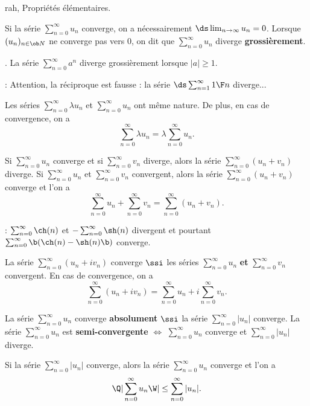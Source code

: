 \Subsection rah, Propriétés élémentaires.


Si la série $\sum_{n=0}^\infty u_n$ converge, on a nécessairement $\ds\lim_{n\to\infty}u_n=0$. \medskip\noindent
Lorsque $(u_n)_{n\in\ob N}$ ne converge pas vers $0$, 
on dit que $\sum_{n=0}^\infty u_n$ diverge {\bf grossièrement}. 

\Exemple. La série $\sum_{n=0}^\infty a^n$ diverge grossièrement lorsque $|a|\ge1$. 
\bigskip

\Remarque : Attention, la réciproque est fausse : la série $\ds\sum_{n=1}^\infty{1\F n}$ diverge... 
\bigskip



Les séries $\sum_{n=0}^\infty \lambda u_n$ et $\sum_{n=0}^\infty u_n$ ont même nature. 
De plus, en cas de convergence, on a 
\Equation [\bf Multiplication]
$$
\sum_{n=0}^\infty\lambda u_n=\lambda\sum_{n=0}^\infty u_n. 
$$

Si $\sum_{n=0}^\infty u_n$ converge et si $\sum_{n=0}^\infty v_n$ diverge, 
alors la série $\sum_{n=0}^\infty(u_n+v_n)$ diverge. \medskip\noindent 
Si $\sum_{n=0}^\infty u_n$ et $\sum_{n=0}^\infty v_n$ convergent, 
alors la série $\sum_{n=0}^\infty(u_n+v_n)$ converge et l'on a 
\Equation[\bf Addition]
$$
\sum_{n=0}^\infty u_n+\sum_{n=0}^\infty v_n=\sum_{n=0}^\infty(u_n+v_n).
$$ 

\Remarque : $\sum_{n=0}^\infty\ch(n)$ et $-\sum_{n=0}^\infty\sh(n)$ divergent et pourtant $\sum_{n=0}^\infty\b(\ch (n)-\sh(n)\b)$ converge. 
\bigskip

La série $\sum_{n=0}^\infty(u_n+iv_n)$ converge $\ssi$ les séries 
$\sum_{n=0}^\infty u_n$ {\bf et} $\sum_{n=0}^\infty v_n$ convergent. 
En cas de convergence, on a 
\Equation [\bf Composantes]
$$
\sum_{n=0}^\infty(u_n+i v_n)=\sum_{n=0}^\infty u_n+i\sum_{n=0}^\infty v_n. 
$$

La série $\sum_{n=0}^\infty u_n$ converge {\bf absolument} $\ssi$ 
la série $\sum_{n=0}^\infty|u_n|$ converge. \medskip\noindent
La série $\sum_{n=0}^\infty u_n$ est {\bf semi-convergente} $\Longleftrightarrow$ 
$\sum_{n=0}^\infty u_n$ converge et $\sum_{n=0}^\infty|u_n|$ diverge. 


Si la série $\sum_{n=0}^\infty|u_n|$ converge, alors la série $\sum_{n=0}^\infty u_n$ converge et l'on a 
$$
\Q|\sum_{n=0}^\infty u_n\W|\le \sum_{n=0}^\infty|u_n|. 
$$


